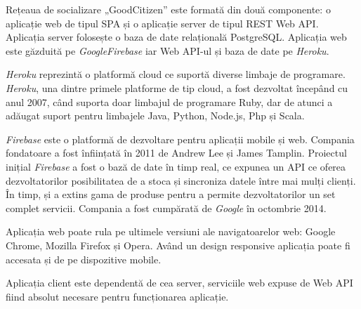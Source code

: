 Rețeaua de socializare „GoodCitizen” este formată din două componente: o aplicație web de tipul SPA și 
o aplicație server de tipul REST Web API. Aplicația server folosește o baza de date relațională PostgreSQL. 
Aplicația web este găzduită pe \textit{GoogleFirebase} iar Web API-ul și baza de date pe \textit{Heroku}.

\textit{Heroku} reprezintă o platformă cloud ce suportă diverse limbaje de programare.
\textit{Heroku}, una dintre primele platforme de tip cloud, a fost dezvoltat începând cu anul 2007, când
suporta doar limbajul de programare Ruby, dar de atunci a adăugat suport pentru limbajele Java, 
Python, Node.js, Php și Scala.

\textit{Firebase} este o platformă de dezvoltare pentru aplicații mobile și web. Compania fondatoare a fost înființată în 2011 de 
Andrew Lee și James Tamplin. Proiectul inițial \textit{Firebase} a fost o bază de date în timp real, ce expunea un 
API ce oferea dezvoltatorilor posibilitatea de a stoca și sincroniza datele între mai mulți clienți. 
În timp, și a extins gama de produse pentru a permite dezvoltatorilor un set complet servicii. 
Compania a fost cumpărată de \textit{Google} în octombrie 2014.

Aplicația web poate rula pe ultimele versiuni ale navigatoarelor web: Google Chrome, Mozilla Firefox și Opera. 
Având un design responsive aplicația poate fi accesata și de pe dispozitive mobile.

    Aplicația client este dependentă de cea server, serviciile web expuse de Web API fiind absolut necesare 
pentru funcționarea aplicație.

